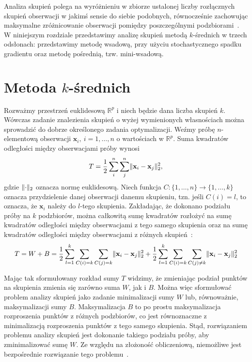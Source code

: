 \documentclass{praca1}
\DeclarePairedDelimiter{\norm}{\lVert}{\rVert}
\begin{document}
Analiza skupień polega na wyróżnieniu w zbiorze ustalonej liczby rozłącznych skupień obserwacji w jakimś sensie do siebie podobnych, równocześnie zachowując maksymalne zróżnicowanie obserwacji pomiędzy poszczególnymi podzbiorami~\cite{Koronacki2005:statystyczne}. W niniejszym rozdziale przedstawimy analizę skupień metodą $k$-średnich w trzech odsłonach: przedstawimy metodę wsadową, przy użyciu stochastycznego spadku gradientu oraz metodę pośrednią, tzw. mini-wsadową.

\section{Metoda $k$-średnich}

Rozważmy przestrzeń euklidesową $\mathbb{R}^p$ i niech będzie dana liczba skupień $k$. Wówczas zadanie znalezienia skupień o wyżej wymienionych własnościach można sprowadzić do dobrze określonego zadania optymalizacji. Weźmy próbę $n$-elementową obserwacji $\mathbf{x}_i,\ i = 1,\ldots,n$ o wartościach w $\mathbb{R}^p$. %
Suma kwadratów odległości między obserwacjami próby wynosi~\cite{Koronacki2005:statystyczne}
\begin{equation}
T = \frac{1}{2}\sum\limits_{i}^{n}\sum\limits_{j}^{n} \norm{\mathbf{x}_i - \mathbf{x}_j}_2^2,
\end{equation}
gdzie $\norm{\cdot}_2$ oznacza normę euklidesową. Niech funkcja $C:\{1,\ldots,n\} \rightarrow \{1,\ldots, k\}$ oznacza przydzielenie danej obserwacji danemu skupieniu, tzn. jeśli $C(i) = l$, to oznacza, że $\mathbf{x}_i$ należy do $l$-tego skupienia. Zakładając, że dokonano podziału próby na $k$ podzbiorów, można całkowitą sumę kwadratów rozłożyć na sumę kwadratów odległości między obserwacjami z tego samego skupienia oraz na sumę kwadratów odległości między obserwacjami z różnych skupień~\cite{Koronacki2005:statystyczne}:
\begin{equation}
T = W + B = \frac{1}{2}\sum\limits_{l=1}^{k}\sum\limits_{C(i) = k}\sum\limits_{C(j) = k} \norm{\mathbf{x}_i - \mathbf{x}_j}_2^2 + \frac{1}{2}\sum\limits_{l=1}^{k}\sum\limits_{C(i) = k}\sum\limits_{C(j) \neq k} \norm{\mathbf{x}_i - \mathbf{x}_j}_2^2 
\end{equation}

Mając tak sformułowany rozkład sumy $T$ widzimy, że zmieniając podział punktów na skupienia zmienia się zarówno suma $W$, jak i $B$. Można więc sformułować problem analizy skupień jako zadanie minimalizacji sumy $W$ lub, równoważnie, maksymalizacji sumy $B$. Maksymalizacja $B$ to po prostu maksymalizacja rozproszenia punktów z różnych podzbiorów, co jest równoznaczne z minimalizacją rozproszenia punktów z tego samego skupienia. Stąd, rozwiązaniem problemu analizy skupień jest dokonanie takiego podziału próby, aby zminimalizować sumę $W$. Ze względu na złożoność obliczeniową, niemożliwe jest bezpośrednie rozwiązanie tego problemu~\cite{Koronacki2005:statystyczne}.
\end{document}

